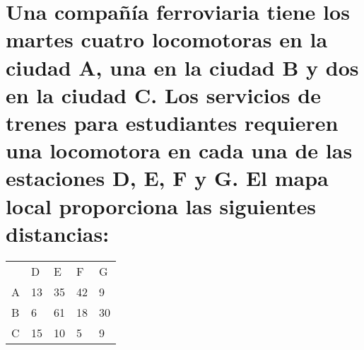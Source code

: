 \section{Una compañía ferroviaria tiene los martes cuatro locomotoras en la ciudad A, una en
la ciudad B y dos en la ciudad C. Los servicios de trenes para estudiantes requieren una
locomotora en cada una de las estaciones D, E, F y G. El mapa local proporciona las
siguientes distancias:}

\centering
\begin{tabular}{lllll}
 & D & E & F & G \\ \cline{2-5} 
\multicolumn{1}{l|}{A} & \multicolumn{1}{l|}{13} & \multicolumn{1}{l|}{35} & \multicolumn{1}{l|}{42} & \multicolumn{1}{l|}{9} \\ \cline{2-5} 
\multicolumn{1}{l|}{B} & \multicolumn{1}{l|}{6} & \multicolumn{1}{l|}{61} & \multicolumn{1}{l|}{18} & \multicolumn{1}{l|}{30} \\ \cline{2-5} 
\multicolumn{1}{l|}{C} & \multicolumn{1}{l|}{15} & \multicolumn{1}{l|}{10} & \multicolumn{1}{l|}{5} & \multicolumn{1}{l|}{9} \\ \cline{2-5} 
\end{tabular}



